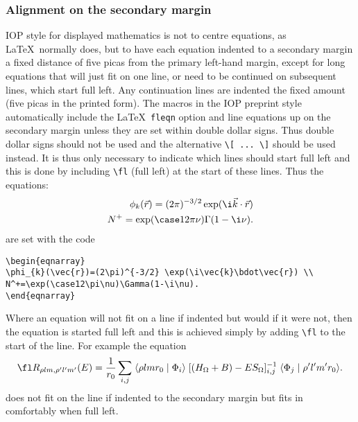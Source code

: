 \subsubsection{Alignment on the secondary margin}
IOP style for displayed mathematics is not to centre equations,
as \LaTeX\ normally does, but to have each equation indented to a
secondary margin a fixed
distance of five picas from the primary left-hand margin, except for long
equations that will just fit on one line, or need to be continued on
subsequent lines, which start full left.
Any continuation lines are indented the fixed amount (five picas in the
printed form).
The macros in the IOP preprint style automatically include the
\LaTeX\ \verb"fleqn"
option and line equations up on the
secondary margin unless they are set within double dollar signs.
Thus double dollar signs should not be used and the alternative
\verb"\[ ... \]" should be used instead.
It is thus only necessary to indicate which lines
should start full left and this is done by including \verb"\fl" (full
left) at the start of these lines.
Thus the equations:
\begin{eqnarray}
\phi_{k}(\vec{r})=(2\pi)^{-3/2} \exp(\i\vec{k}\cdot\vec{r}) \\
N^+=\exp(\case12\pi\nu)\Gamma(1-\i\nu).
\end{eqnarray}
are set with the code
\begin{verbatim}
\begin{eqnarray}
\phi_{k}(\vec{r})=(2\pi)^{-3/2} \exp(\i\vec{k}\bdot\vec{r}) \\
N^+=\exp(\case12\pi\nu)\Gamma(1-\i\nu).
\end{eqnarray}
\end{verbatim}
Where an equation will not fit on a line if indented but would if it
were not, then the equation is started full left and this is achieved
simply by adding \verb"\fl" to the start of the line. For example
the equation
\begin{equation}
\fl R_{\rho l m,\rho'l'm'}(E)=\frac{1}{r_0}\sum_{i,j}\;\langle\rho l m r_0
\mid\Phi_i\rangle\; [(H_{\Omega}+B)-ES_{\Omega}]^{-1}_{i,j}\;\langle\Phi_j
\mid\rho'l'm'r_0\rangle.
\end{equation}
does not fit on the line if indented to the secondary margin but fits in
comfortably when full left.


